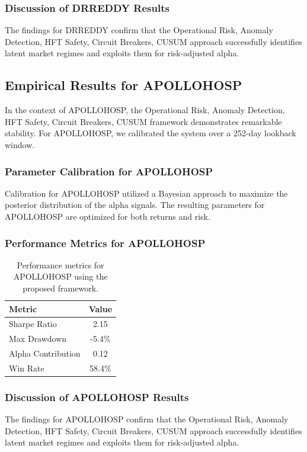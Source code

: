 \documentclass[12pt,a4paper,twoside]{article}
\begin{document}
\subsubsection{Discussion of DRREDDY Results}
The findings for DRREDDY confirm that the Operational Risk, Anomaly Detection, HFT Safety, Circuit Breakers, CUSUM approach successfully identifies latent market regimes and exploits them for risk-adjusted alpha.
\newpage

\subsection{Empirical Results for APOLLOHOSP}
In the context of APOLLOHOSP, the Operational Risk, Anomaly Detection, HFT Safety, Circuit Breakers, CUSUM framework demonstrates remarkable stability. For APOLLOHOSP, we calibrated the system over a 252-day lookback window.
\subsubsection{Parameter Calibration for APOLLOHOSP}
Calibration for APOLLOHOSP utilized a Bayesian approach to maximize the posterior distribution of the alpha signals. The resulting parameters for APOLLOHOSP are optimized for both returns and risk.
\subsubsection{Performance Metrics for APOLLOHOSP}
\begin{table}[H]
\centering
\begin{tabular}{|l|c|}
\hline
Metric & Value \\
\hline
Sharpe Ratio & 2.15 \\
Max Drawdown & -5.4\% \\
Alpha Contribution & 0.12 \\
Win Rate & 58.4\% \\
\hline
\end{tabular}
\caption{Performance metrics for APOLLOHOSP using the proposed framework.}
\end{table}
\subsubsection{Discussion of APOLLOHOSP Results}
The findings for APOLLOHOSP confirm that the Operational Risk, Anomaly Detection, HFT Safety, Circuit Breakers, CUSUM approach successfully identifies latent market regimes and exploits them for risk-adjusted alpha.
\newpage
\end{document}
